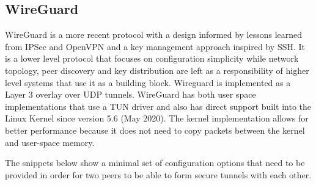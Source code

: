 \hypertarget{wireguard}{%
\subsection{WireGuard}\label{wireguard}}

WireGuard\autocite{donenfeldWireGuardNextGeneration2017} is a more
recent protocol with a design informed by lessons learned from IPSec and
OpenVPN and a key management approach inspired by SSH. It is a lower
level protocol that focuses on configuration simplicity while network
topology, peer discovery and key distribution are left as a
responsibility of higher level systems that use it as a building block.
Wireguard is implemented as a Layer 3 overlay over UDP tunnels.
WireGuard has both user space implementations that use a TUN driver and
also has direct support built into the Linux Kernel since version 5.6
(May 2020). The kernel implementation allows for better performance
because it does not need to copy packets between the kernel and
user-space memory.

The snippets below show a minimal set of configuration options that need
to be provided in order for two peers to be able to form secure tunnels
with each other.

\begin{Shaded}
\begin{Highlighting}[]
\KeywordTok{[Interface]}
\OtherTok{=}
\OtherTok{=}\StringTok{ }
\OtherTok{=}

\KeywordTok{[Peer]}
\OtherTok{=}
\OtherTok{=}
\OtherTok{=}
\end{Highlighting}
\end{Shaded}

\begin{Shaded}
\begin{Highlighting}[]
\KeywordTok{[Interface]}
\OtherTok{=}
\OtherTok{=}\StringTok{ }
\OtherTok{=}

\KeywordTok{[Peer]}
\OtherTok{=}
\OtherTok{=}
\end{Highlighting}
\end{Shaded}

